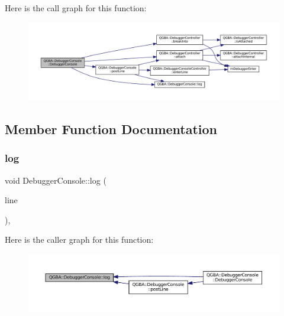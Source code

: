 Here is the call graph for this function\+:
\nopagebreak
\begin{figure}[H]
\begin{center}
\leavevmode
\includegraphics[width=350pt]{class_q_g_b_a_1_1_debugger_console_a2a21572e0ebb866fbffac35f3832794a_cgraph}
\end{center}
\end{figure}


\subsection{Member Function Documentation}
\mbox{\label{class_q_g_b_a_1_1_debugger_console_a8a855b6d7d76cc5bed317e80ea9517e4}} 
\subsubsection{\texorpdfstring{log}{log}}
{\footnotesize\ttfamily void Debugger\+Console\+::log (\begin{DoxyParamCaption}\item[{const Q\+String \&}]{line }\end{DoxyParamCaption})\hspace{0.3cm}{\ttfamily [private]}, {\ttfamily [slot]}}

Here is the caller graph for this function\+:
\nopagebreak
\begin{figure}[H]
\begin{center}
\leavevmode
\includegraphics[width=350pt]{class_q_g_b_a_1_1_debugger_console_a8a855b6d7d76cc5bed317e80ea9517e4_icgraph}
\end{center}
\end{figure}
\mbox{\label{class_q_g_b_a_1_1_debugger_console_a6364d65b410dd27638c5efc20fcb1559}} 
